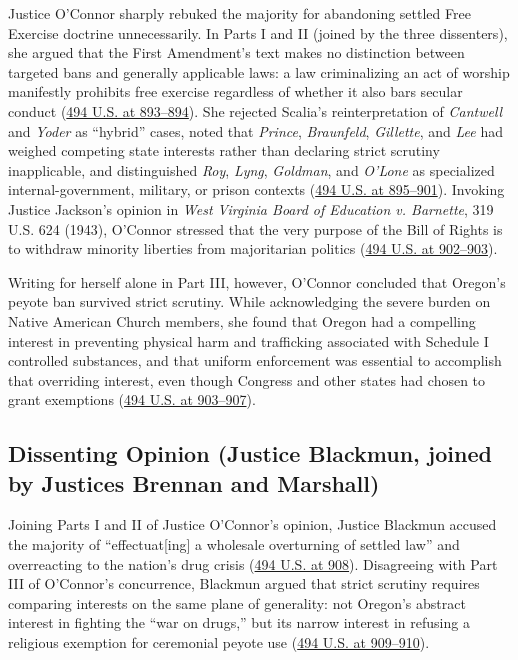 \documentclass[12pt]{article}
\begin{document}
Justice O'Connor sharply rebuked the majority for abandoning settled Free Exercise doctrine unnecessarily. In Parts I and II (joined by the three dissenters), she argued that the First Amendment's text makes no distinction between targeted bans and generally applicable laws: a law criminalizing an act of worship manifestly prohibits free exercise regardless of whether it also bars secular conduct (\href{https://supreme.justia.com/cases/federal/us/494/872/}{494 U.S. at 893--894}). She rejected Scalia's reinterpretation of \textit{Cantwell} and \textit{Yoder} as ``hybrid'' cases, noted that \textit{Prince}, \textit{Braunfeld}, \textit{Gillette}, and \textit{Lee} had weighed competing state interests rather than declaring strict scrutiny inapplicable, and distinguished \textit{Roy}, \textit{Lyng}, \textit{Goldman}, and \textit{O'Lone} as specialized internal-government, military, or prison contexts (\href{https://supreme.justia.com/cases/federal/us/494/872/}{494 U.S. at 895--901}). Invoking Justice Jackson's opinion in \textit{West Virginia Board of Education v. Barnette}, 319 U.S. 624 (1943), O'Connor stressed that the very purpose of the Bill of Rights is to withdraw minority liberties from majoritarian politics (\href{https://supreme.justia.com/cases/federal/us/494/872/}{494 U.S. at 902--903}).

Writing for herself alone in Part III, however, O'Connor concluded that Oregon's peyote ban survived strict scrutiny. While acknowledging the severe burden on Native American Church members, she found that Oregon had a compelling interest in preventing physical harm and trafficking associated with Schedule I controlled substances, and that uniform enforcement was essential to accomplish that overriding interest, even though Congress and other states had chosen to grant exemptions (\href{https://supreme.justia.com/cases/federal/us/494/872/}{494 U.S. at 903--907}).

\subsection{Dissenting Opinion (Justice Blackmun, joined by Justices Brennan and Marshall)}

Joining Parts I and II of Justice O'Connor's opinion, Justice Blackmun accused the majority of ``effectuat[ing] a wholesale overturning of settled law'' and overreacting to the nation's drug crisis (\href{https://supreme.justia.com/cases/federal/us/494/872/}{494 U.S. at 908}). Disagreeing with Part III of O'Connor's concurrence, Blackmun argued that strict scrutiny requires comparing interests on the same plane of generality: not Oregon's abstract interest in fighting the ``war on drugs,'' but its narrow interest in refusing a religious exemption for ceremonial peyote use (\href{https://supreme.justia.com/cases/federal/us/494/872/}{494 U.S. at 909--910}).
\end{document}
